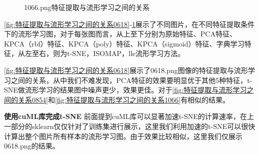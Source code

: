 \documentclass[12pt,hyperref,a4paper,UTF8]{ctexart}
\begin{document}
{\begin{figure}[!h]
{	}
	
	\caption{1066.png特征提取与流形学习之间的关系}
	\label{fig:特征提取与流形学习之间的关系1066}
\end{figure}


\par


\autoref{fig:特征提取与流形学习之间的关系0618}-\ref{fig:特征提取与流形学习之间的关系1066}展示了不同图片，在不同特征提取条件下的流形学习图，对于每张图而言，从上至下分别为原始特征、PCA特征、KPCA（rbf）特征、KPCA（poly）特征、KPCA（sigmoid）特征、字典学习特征，从左至右，则为t-SNE，ISOMAP，lle流形学习方法。

\par
\autoref{fig:特征提取与流形学习之间的关系0618}展示了0618.png图像的特征提取与流形学习之间的关系，从中我们不难发现，PCA特征的效果要明显优于其他5种特征，t-SNE做流形学习的结果图中噪声更少，效果更佳。对于\autoref{fig:特征提取与流形学习之间的关系0854}和\autoref{fig:特征提取与流形学习之间的关系1066}有相似的结果。

\textbf{使用cuML库完成t-SNE}
前面提到cuML库可以显著加速t-SNE的计算速率，在上一部分的sklearn仅仅针对了训练集进行展示，这里我们利用加速的t-SNE可以很快计算出整个图片所有样本的流形学习图。由于效果比较相似，这里我们仅展示0618.png的结果。

}
\end{document}
